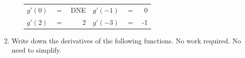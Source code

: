 \documentclass[11pt]{article}
\begin{document}
\begin{enumerate}
\begin{enumerate}
\begin{center}
\begin{tikzpicture}[scale=1.25]
        
    \end{tikzpicture}
    \end{center}

    \begin{center}
        \begin{tabular}{l c r l c r}
            $g'(0)$ & $=$ & {\color{blue} DNE} &
            $g'(-1)$ & $=$ & {\color{blue} 0}\\[0.3in]
            $g'(2)$ & $=$ & {\color{blue} 2} & 
            $g'(-3)$ & $=$ & {\color{blue} -1}\\[0.3in]
        \end{tabular} 
\end{center}

    

\end{enumerate}


\newpage


\item Write down the derivatives of the following functions. No work required. No need to simplify.


\end{enumerate}
\end{document}
